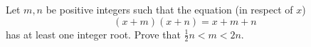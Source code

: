 Let $m,n$ be positive integers such that the equation (in respect of $x$)
\[(x+m)(x+n)=x+m+n\]
has at least one integer root. Prove that $\frac{1}{2}n<m<2n$.